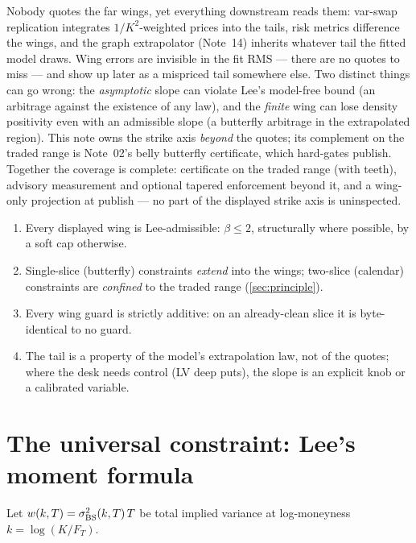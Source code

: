 \documentclass[11pt]{article}
\begin{document}
Nobody quotes the far wings, yet everything downstream reads them: var-swap
replication integrates $1/K^2$-weighted prices into the tails, risk metrics
difference the wings, and the graph extrapolator (Note~14) inherits whatever
tail the fitted model draws. Wing errors are invisible in the fit RMS ---
there are no quotes to miss --- and show up later as a mispriced tail
somewhere else. Two distinct things can go wrong: the \emph{asymptotic} slope
can violate Lee's model-free bound (an arbitrage against the existence of any
law), and the \emph{finite} wing can lose density positivity even with an
admissible slope (a butterfly arbitrage in the extrapolated region). This
note owns the strike axis \emph{beyond} the quotes; its complement on the
traded range is Note~02's belly butterfly certificate, which hard-gates
publish. Together the coverage is complete: certificate on the traded range
(with teeth), advisory measurement and optional tapered enforcement beyond
it, and a wing-only projection at publish --- no part of the displayed
strike axis is uninspected.

\begin{invariant}
\begin{enumerate}[leftmargin=1.6em]
\item Every displayed wing is Lee-admissible: $\beta\le2$, structurally where
possible, by a soft cap otherwise.
\item Single-slice (butterfly) constraints \emph{extend} into the wings;
two-slice (calendar) constraints are \emph{confined} to the traded range
(\cref{sec:principle}).
\item Every wing guard is strictly additive: on an already-clean slice it is
byte-identical to no guard.
\item The tail is a property of the model's extrapolation law, not of the
quotes; where the desk needs control (LV deep puts), the slope is an explicit
knob or a calibrated variable.
\end{enumerate}
\end{invariant}

\section{The universal constraint: Lee's moment formula}
\label{sec:lee}

Let $w(k,T)=\sigma_{\mathrm{BS}}^2(k,T)\,T$ be total implied variance at log-moneyness
$k=\log(K/F_T)$.
\end{document}
